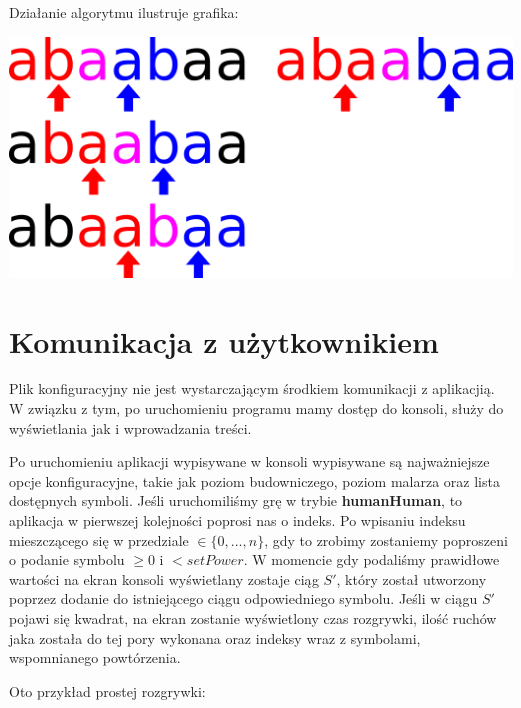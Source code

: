 \documentclass[document]{xmgr}
\begin{document}
Działanie algorytmu ilustruje grafika:
\begin{center}
\includegraphics[scale = 0.2]{images/overlapFinding}
\end{center}

\section{Komunikacja z użytkownikiem}
Plik konfiguracyjny nie jest wystarczającym środkiem komunikacji z aplikacjią. W związku z tym, po uruchomieniu programu mamy dostęp do konsoli, służy do wyświetlania jak i wprowadzania treści.

Po uruchomieniu aplikacji wypisywane w konsoli wypisywane są najważniejsze opcje konfiguracyjne, takie jak poziom budowniczego, poziom malarza oraz lista dostępnych symboli. Jeśli uruchomiliśmy grę w trybie \textbf{humanHuman}, to aplikacja w pierwszej kolejności poprosi nas o indeks. Po wpisaniu indeksu mieszczącego się w przedziale $\in \{0,...,n\}$, gdy to zrobimy zostaniemy poproszeni o podanie symbolu $\geq 0$ i $< setPower$. W momencie gdy podaliśmy prawidłowe wartości na ekran konsoli wyświetlany zostaje ciąg $S'$, który został utworzony poprzez dodanie do istniejącego ciągu odpowiedniego symbolu. Jeśli w ciągu $S'$ pojawi się kwadrat, na ekran zostanie wyświetlony czas rozgrywki, ilość ruchów jaka została do tej pory wykonana oraz indeksy wraz z symbolami, wspomnianego powtórzenia.

Oto przykład prostej rozgrywki:
\end{document}
